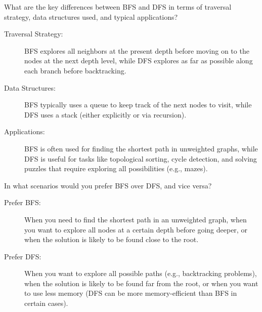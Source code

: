 \begin{ejercicio}
    What are the key differences between BFS and DFS in terms of traversal strategy, data structures used, and typical applications?
    \begin{description}
        \item[Traversal Strategy:] BFS explores all neighbors at the present depth before moving on to the nodes at the next depth level, while DFS explores as far as possible along each branch before backtracking.
        \item[Data Structures:] BFS typically uses a queue to keep track of the next nodes to visit, while DFS uses a stack (either explicitly or via recursion).
        \item[Applications:] BFS is often used for finding the shortest path in unweighted graphs, while DFS is useful for tasks like topological sorting, cycle detection, and solving puzzles that require exploring all possibilities (e.g., mazes).
    \end{description}
\end{ejercicio}
\begin{ejercicio}
    In what scenarios would you prefer BFS over DFS, and vice versa?
    \begin{description}
        \item[Prefer BFS:] When you need to find the shortest path in an unweighted graph, when you want to explore all nodes at a certain depth before going deeper, or when the solution is likely to be found close to the root.
        \item[Prefer DFS:] When you want to explore all possible paths (e.g., backtracking problems), when the solution is likely to be found far from the root, or when you want to use less memory (DFS can be more memory-efficient than BFS in certain cases).
    \end{description}
\end{ejercicio}


